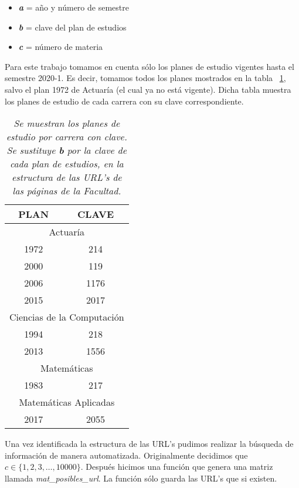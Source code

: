 \begin{itemize}
\item[ ] \textit{\textbf{a}} = año y número de semestre

\item[ ] \textit{\textbf{b}} = clave del plan de estudios

\item[ ] \textit{\textbf{c}} = número de materia
\end{itemize}

Para este trabajo tomamos en cuenta sólo los planes de estudio vigentes hasta el semestre 2020-1. Es decir, tomamos todos los planes mostrados en la tabla \tablename{~\ref{PlanesEstudio}}, salvo el plan 1972 de Actuaría (el cual ya no está vigente). Dicha tabla muestra los planes de estudio de cada carrera con su clave correspondiente.

\begin{table}[h]
\centering
\begin{tabular}{|c|c|}
 \hline 
  \textbf{PLAN} & \textbf{CLAVE} \\ 
 \hline 
 \multicolumn{2}{|c|}{Actuaría} \\ 
 \hline 
 1972 & 214 \\ 
 \hline 
 2000 & 119 \\ 
 \hline 
 2006 & 1176 \\ 
 \hline 
 2015 & 2017 \\ 
 \hline 
 \multicolumn{2}{|c|}{Ciencias de la Computación} \\ 
 \hline 
 1994 & 218 \\ 
 \hline 
 2013 & 1556 \\ 
 \hline 
 \multicolumn{2}{|c|}{Matemáticas} \\ 
 \hline 
 1983 & 217 \\ 
 \hline 
 \multicolumn{2}{|c|}{Matemáticas Aplicadas} \\ 
 \hline 
 2017 & 2055 \\ 
 \hline 
 \end{tabular}
\caption[\textit{Planes de estudio por carrera con clave}]{\textit{Se muestran los planes de estudio por carrera con clave. Se sustituye \textbf{b} por la clave de cada plan de estudios, en la estructura de las URL's de las páginas de la Facultad.}}\label{PlanesEstudio}
\end{table}

Una vez identificada la estructura de las URL's pudimos realizar la búsqueda de información de manera automatizada. Originalmente decidimos que $c \in \{1,2,3, \ldots, 10 000\}$. Después hicimos una función que genera una matriz llamada \textit{mat\_posibles\_url}. La función sólo guarda las URL's que si existen.

